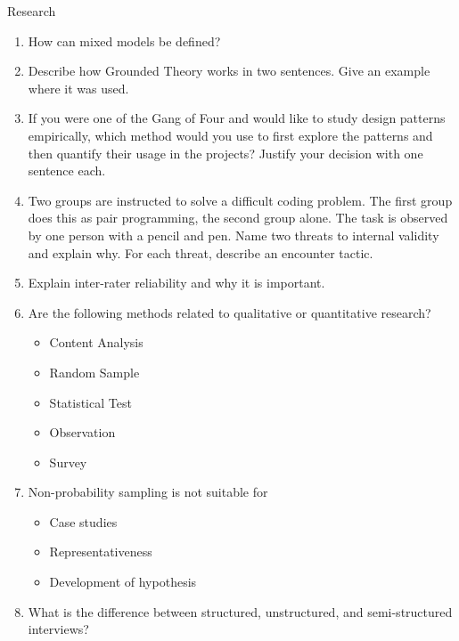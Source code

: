 \documentclass{article}
\begin{document}
\begin{exercise}{Research}
  \begin{enumerate}
    \item How can mixed models be defined?
    \item Describe how Grounded Theory works in two sentences. Give an example where it was used.
    \item If you were one of the Gang of Four and would like to study design patterns empirically, which method would you use to first explore the patterns and then quantify their usage in the projects? Justify your decision with one sentence each.
    \item Two groups are instructed to solve a difficult coding problem. The first group does this as pair programming, the second group alone. The task is observed by one person with a pencil and pen. Name two threats to internal validity and explain why. For each threat, describe an encounter tactic.
    \item Explain inter-rater reliability and why it is important.
    \item Are the following methods related to qualitative or quantitative research?
      \begin{itemize}
        \item Content Analysis
        \item Random Sample
        \item Statistical Test
        \item Observation
        \item Survey
      \end{itemize}
    \item Non-probability sampling is not suitable for
      \begin{itemize}
        \item Case studies
        \item Representativeness
        \item Development of hypothesis
      \end{itemize}
    \item What is the difference between structured, unstructured, and semi-structured interviews?
  \end{enumerate}

  \begin{solution}
  \end{solution}
\end{exercise}
\end{document}
